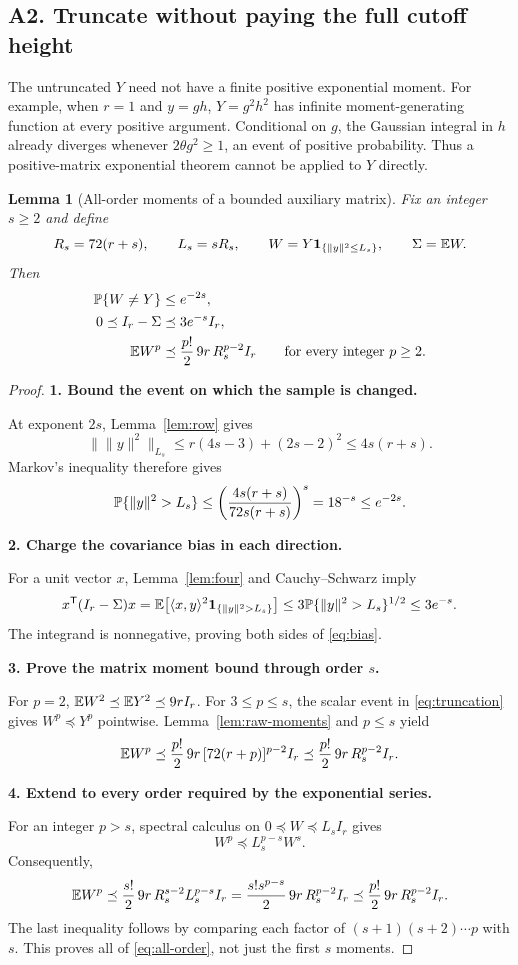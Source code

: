 \documentclass[11pt]{article}
\numberwithin{equation}{section}
\newtheorem{lemma}[theorem]{Lemma}
\theoremstyle{definition}\newtheorem{definition}[theorem]{Definition}
\theoremstyle{remark}\newtheorem{remark}[theorem]{Remark}
\newcommand{\norm}[1]{\lVert#1\rVert}\newcommand{\ip}[2]{\langle#1,#2\rangle}
\newcommand{\one}{\mathbf1}\newcommand{\F}{\mathrm F}
\newcommand{\step}[1]{\par\addvspace{.65\baselineskip}\Needspace{4\baselineskip}\noindent\textbf{#1}\par\nobreak\smallskip}
\begin{document}
\subsection{A2. Truncate without paying the full cutoff height}
The untruncated $Y$ need not have a finite positive exponential moment. For example,
when $r=1$ and $y=gh$, $Y=g^2h^2$ has infinite moment-generating function at every
positive argument. Conditional on $g$, the Gaussian integral in $h$ already diverges
whenever $2\theta g^2\ge1$, an event of positive probability.
Thus a positive-matrix exponential theorem cannot be applied to $Y$ directly.

\begin{lemma}[All-order moments of a bounded auxiliary matrix]\label{lem:truncate}
Fix an integer $s\ge2$ and define
\begin{equation}\label{eq:truncation}
 R_s=72(r+s),\qquad L_s=sR_s,\qquad
 W=Y\one_{\{\norm y^2\le L_s\}},\qquad\Sigma=\E W.
\end{equation}
Then
\begin{align}
 \mathbb P\{W\ne Y\}&\le e^{-2s},\label{eq:clip}\\
 0\preceq I_r-\Sigma&\preceq3e^{-s}I_r,\label{eq:bias}\\
 \mathbb E W^p&\preceq\frac{p!}{2}\,9r\,R_s^{p-2}I_r
 \qquad\text{for every integer }p\ge2.\label{eq:all-order}
\end{align}
\end{lemma}
\begin{proof}
\step{1. Bound the event on which the sample is changed.}
At exponent $2s$, Lemma~\ref{lem:row} gives
\[
 \bigl\|\norm y^2\bigr\|_{L_s}
 \le r(4s-3)+(2s-2)^2\le4s(r+s).
\]
Markov's inequality therefore gives
\[
 \Prob\{\norm y^2>L_s\}
 \le\left(\frac{4s(r+s)}{72s(r+s)}\right)^s
 =18^{-s}\le e^{-2s}.
\]

\step{2. Charge the covariance bias in each direction.}
For a unit vector $x$, Lemma~\ref{lem:four} and Cauchy--Schwarz imply
\[
 x^{\mathsf T}(I_r-\Sigma)x
 =\E\bigl[\ip{x}{y}^2\one_{\{\norm y^2>L_s\}}\bigr]
 \le3\Prob\{\norm y^2>L_s\}^{1/2}\le3e^{-s}.
\]
The integrand is nonnegative, proving both sides of \eqref{eq:bias}.

\step{3. Prove the matrix moment bound through order $s$.}
For $p=2$, $\mathbb E W^2\preceq\mathbb E Y^2\preceq9rI_r$.
For $3\le p\le s$, the scalar event in \eqref{eq:truncation} gives
$W^p\preceq Y^p$ pointwise. Lemma~\ref{lem:raw-moments} and $p\le s$ yield
\[
 \mathbb E W^p\preceq\frac{p!}{2}\,9r\,[72(r+p)]^{p-2}I_r
 \preceq\frac{p!}{2}\,9r\,R_s^{p-2}I_r.
\]

\step{4. Extend to every order required by the exponential series.}
For an integer $p>s$, spectral calculus on $0\preceq W\preceq L_sI_r$ gives
\[
 W^p\preceq L_s^{p-s}W^s.
\]
Consequently,
\[
 \mathbb E W^p\preceq\frac{s!}{2}\,9r\,R_s^{s-2}L_s^{p-s}I_r
 =\frac{s!s^{p-s}}{2}\,9r\,R_s^{p-2}I_r
 \preceq\frac{p!}{2}\,9r\,R_s^{p-2}I_r.
\]
The last inequality follows by comparing each factor of
$(s+1)(s+2)\cdots p$ with $s$. This proves all of \eqref{eq:all-order},
not just the first $s$ moments.
\end{proof}
\end{document}
